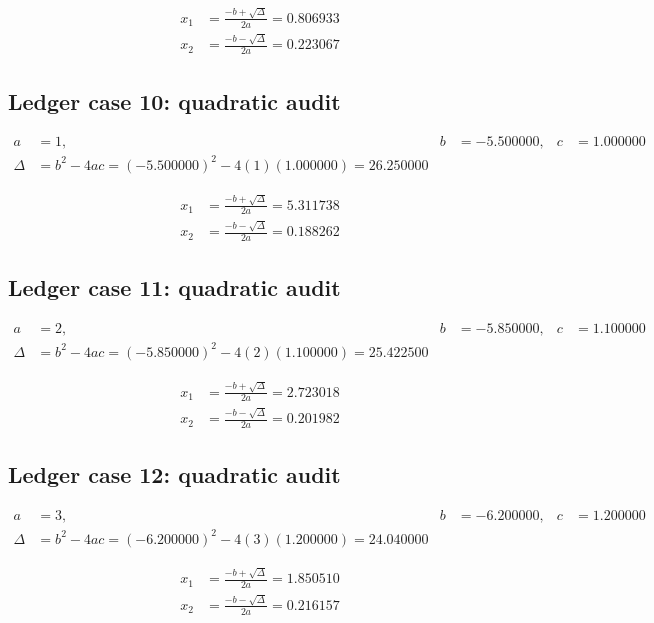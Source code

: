 \documentclass[11pt,a4paper]{article}
\begin{document}
\begin{align}
x_1 &= \frac{-b+\sqrt{\Delta}}{2a} = 0.806933 \\
x_2 &= \frac{-b-\sqrt{\Delta}}{2a} = 0.223067
\end{align}

\newpage

\subsection{Ledger case 10: quadratic audit}
\begin{align}
a &= 1, & b &= -5.500000, & c &= 1.000000 \\
\Delta &= b^2-4ac = (-5.500000)^2 - 4(1)(1.000000) = 26.250000
\end{align}

\begin{align}
x_1 &= \frac{-b+\sqrt{\Delta}}{2a} = 5.311738 \\
x_2 &= \frac{-b-\sqrt{\Delta}}{2a} = 0.188262
\end{align}

\subsection{Ledger case 11: quadratic audit}
\begin{align}
a &= 2, & b &= -5.850000, & c &= 1.100000 \\
\Delta &= b^2-4ac = (-5.850000)^2 - 4(2)(1.100000) = 25.422500
\end{align}

\begin{align}
x_1 &= \frac{-b+\sqrt{\Delta}}{2a} = 2.723018 \\
x_2 &= \frac{-b-\sqrt{\Delta}}{2a} = 0.201982
\end{align}

\subsection{Ledger case 12: quadratic audit}
\begin{align}
a &= 3, & b &= -6.200000, & c &= 1.200000 \\
\Delta &= b^2-4ac = (-6.200000)^2 - 4(3)(1.200000) = 24.040000
\end{align}

\begin{align}
x_1 &= \frac{-b+\sqrt{\Delta}}{2a} = 1.850510 \\
x_2 &= \frac{-b-\sqrt{\Delta}}{2a} = 0.216157
\end{align}
\end{document}
